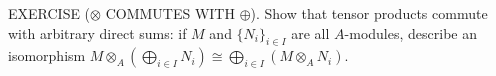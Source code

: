 EXERCISE ($\otimes$ COMMUTES WITH $\oplus$). Show that tensor products commute with arbitrary direct sums: if $M$ and $\{N_i\}_{i\in I}$ are all $A$-modules, describe an isomorphism
$M \otimes_A \left(\bigoplus_{i\in I} N_i\right) \cong \bigoplus_{i\in I}(M \otimes_A N_i)$.
